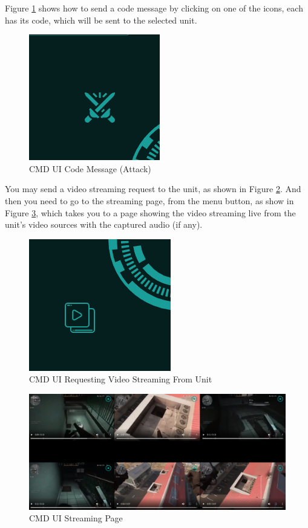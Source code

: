 Figure \ref{fig:cmd-ui-code-msg} shows how to send a code message by clicking on one of the icons, each has its code, which will be sent to the selected unit.

\begin{figure}[!htb]
    \centering
    \includegraphics[width=0.6\linewidth]{images/cmd-ui-code-msg.png}
    \caption{CMD UI Code Message (Attack)}
    \label{fig:cmd-ui-code-msg}
\end{figure}

You may send a video streaming request to the unit, as shown in Figure \ref{fig:cmd-ui-req-video}.
And then you need to go to the streaming page, from the menu button, as show in Figure \ref{fig:cmd-ui-streaming}, which takes you to a page showing the video streaming live from the unit's video sources with the captured audio (if any).

\begin{figure}[!htb]
    \centering
    \includegraphics[width=0.6\linewidth]{images/cmd-ui-req-video.png}
    \caption{CMD UI Requesting Video Streaming From Unit}
    \label{fig:cmd-ui-req-video}
\end{figure}

\begin{figure}[!htb]
    \centering
    \includegraphics[width=16cm]{images/cmd-ui-streaming.png}
    \caption{CMD UI Streaming Page}
    \label{fig:cmd-ui-streaming}
\end{figure}
